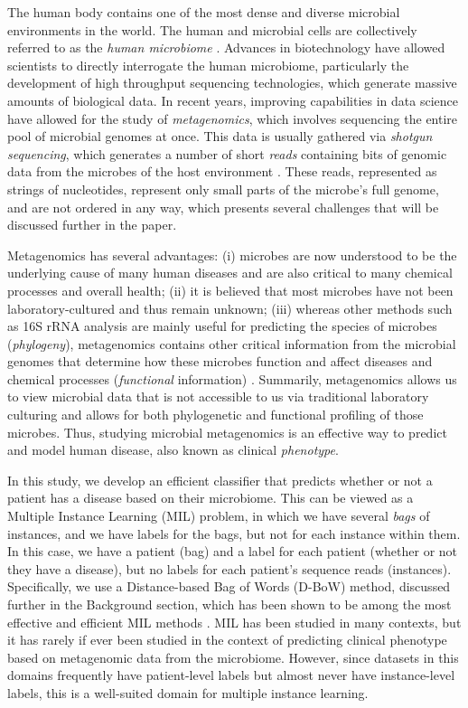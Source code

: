 
The human body contains one of the most dense and diverse microbial environments in the world. The human and microbial cells are collectively referred to as the \emph{human microbiome} \cite{turnbaugh_human_2007,backhed_host-bacterial_2005}. Advances in biotechnology have allowed scientists to directly interrogate the human microbiome, particularly the development of high throughput sequencing technologies, which generate massive amounts of biological data. In recent years, improving capabilities in data science have allowed for the study of \emph{metagenomics}, which involves sequencing the entire pool of microbial genomes at once. This data is usually gathered via \emph{shotgun sequencing}, which generates a number of short \emph{reads} containing bits of genomic data from the microbes of the host environment \cite{messing81}. These reads, represented as strings of nucleotides, represent only small parts of the microbe's full genome, and are not ordered in any way, which presents several challenges that will be discussed further in the paper. 

Metagenomics has several advantages: (i) microbes are now understood to be the underlying cause of many human diseases and are also critical to many chemical processes and overall health; (ii) it is believed that most microbes have not been laboratory-cultured and thus remain unknown; (iii) whereas other methods such as 16S rRNA analysis are mainly useful for predicting the species of microbes (\emph{phylogeny}), metagenomics contains other critical information from the microbial genomes that determine how these microbes function and affect diseases and chemical processes (\emph{functional} information) \cite{handelsman04}. Summarily, metagenomics allows us to view microbial data that is not accessible to us via traditional laboratory culturing and allows for both phylogenetic and functional profiling of those microbes. Thus, studying microbial metagenomics is an effective way to predict and model human disease, also known as clinical \emph{phenotype}.

In this study, we develop an efficient classifier that predicts whether or not a patient has a disease based on their microbiome. This can be viewed as a Multiple Instance Learning (MIL) problem, in which we have several \emph{bags} of instances, and we have labels for the bags, but not for each instance within them. In this case, we have a patient (bag) and a label for each patient (whether or not they have a disease), but no labels for each patient's sequence reads (instances). Specifically, we use a Distance-based Bag of Words (D-BoW) method, discussed further in the Background section, which has been shown to be among the most effective and efficient MIL methods \cite{amores13}. MIL has been studied in many contexts, but it has rarely if ever been studied in the context of predicting clinical phenotype based on metagenomic data from the microbiome. However, since datasets in this domains frequently have patient-level labels but almost never have instance-level labels, this is a well-suited domain for multiple instance learning. 

